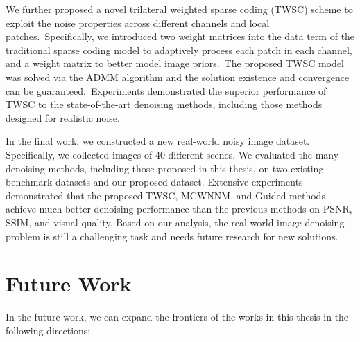 We further proposed a novel trilateral weighted sparse coding (TWSC) scheme to exploit the noise properties across different channels and local patches.\ Specifically, we introduced two weight matrices into the data term of the traditional sparse coding model to adaptively process each patch in each channel, and a weight matrix to better model image priors.\ The proposed TWSC model was solved via the ADMM algorithm and the solution existence and convergence can be guaranteed.\ Experiments demonstrated the superior performance of TWSC to the state-of-the-art denoising methods, including those methods designed for realistic noise.

In the final work, we constructed a new real-world noisy image dataset. Specifically, we collected images of 40 different scenes. We evaluated the many denoising methods, including those proposed in this thesis, on two existing benchmark datasets and our proposed dataset. Extensive experiments demonstrated that the proposed TWSC, MCWNNM, and Guided methods achieve much better denoising performance than the previous methods on PSNR, SSIM, and visual quality. Based on our analysis, the real-world image denoising problem is still a challenging task and needs future research for new solutions.

\section{Future Work}
\label{sec:conclusions:future}

In the future work, we can expand the frontiers of the works in this thesis in the following directions:

